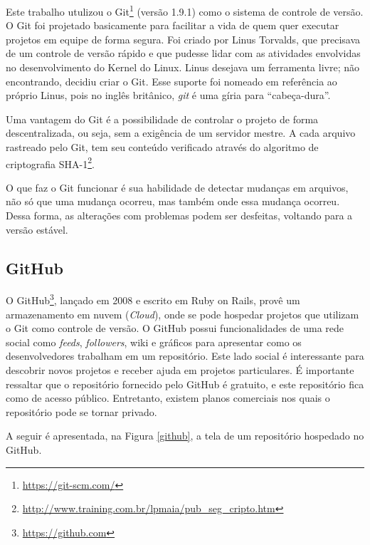 \begin{apendicesenv}
Este trabalho utulizou o Git\footnote{\url{https://git-scm.com/}} (versão 1.9.1) como o sistema de controle de versão. O Git foi projetado basicamente para facilitar a vida de quem quer executar projetos em equipe de forma segura. Foi criado por Linus Torvalds, que precisava de um controle de versão rápido e que pudesse lidar com as atividades envolvidas no desenvolvimento do Kernel do Linux. Linus desejava um ferramenta livre; não encontrando, decidiu criar o Git. Esse suporte foi nomeado em referência ao próprio Linus, pois no inglês britânico, \textit{git} é uma gíria para ``cabeça-dura''.

Uma vantagem do Git é a possibilidade de controlar o projeto de forma descentralizada, ou seja, sem a exigência de um servidor mestre. A cada arquivo rastreado pelo Git, tem seu conteúdo verificado através do algoritmo de criptografia SHA-1\footnote{\url{http://www.training.com.br/lpmaia/pub_seg_cripto.htm}}.

O que faz o Git funcionar é sua habilidade de detectar mudanças em arquivos, não só que uma mudança ocorreu, mas também onde essa mudança ocorreu. Dessa forma, as alterações com problemas podem ser desfeitas, voltando para a versão estável.

\subsection{GitHub}

O GitHub\footnote{\url{https://github.com}}, lançado em 2008 e escrito em Ruby on Rails, provê um armazenamento em nuvem (\textit{Cloud}), onde se pode hospedar projetos que utilizam o Git como controle de versão. O GitHub possui funcionalidades de uma rede social como \textit{feeds}, \textit{followers}, wiki e gráficos para apresentar como os desenvolvedores trabalham em um repositório. Este lado social é interessante para descobrir novos projetos e receber ajuda em projetos particulares. É importante ressaltar que o repositório fornecido pelo GitHub é gratuito, e este repositório fica como de acesso público. Entretanto, existem planos comerciais nos quais o repositório pode se tornar privado.

A seguir é apresentada, na Figura \ref{github}, a tela de um repositório hospedado no GitHub.


\end{apendicesenv}

